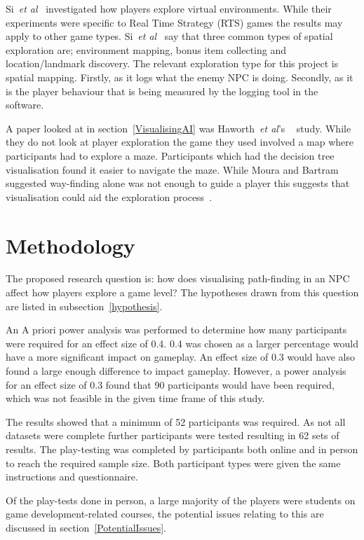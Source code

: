 \documentclass[journal]{IEEEtran}
\begin{document}
	Si~\textit{et al}~\cite{si2017} investigated how players explore virtual environments. While their experiments were specific to Real Time Strategy (RTS) games the results may apply to other game types. Si~\textit{et al}~\cite{si2017} say that three common types of spatial exploration are; environment mapping, bonus item collecting and location/landmark discovery. The relevant exploration type for this project is spatial mapping. Firstly, as it logs what the enemy NPC is doing.  Secondly, as it is the player behaviour that is being measured by the logging tool in the software.
	
	A paper looked at in section~\ref{VisualisingAI} was Haworth~\textit{et al}'s ~\cite{Haworth2010} study. While they do not look at player exploration the game they used involved a map where participants had to explore a maze. Participants which had the decision tree visualisation found it easier to navigate the maze. While Moura and Bartram~\cite{moura2014} suggested way-finding alone was not enough to guide a player this suggests that visualisation could aid the exploration process~\cite{Haworth2010}.
	
	\section{Methodology} \label{methodology}
	The proposed research question is: how does visualising path-finding in an NPC affect how players explore a game level? The hypotheses drawn from this question are listed in subsection~\ref{hypothesis}.  
	
	An A priori power analysis was performed to determine how many participants were required for an effect size of 0.4. 0.4 was chosen as a larger percentage would have a more significant impact on gameplay.  An effect size of 0.3 would have also found a large enough difference to impact gameplay. However, a power analysis for an effect size of 0.3 found that 90 participants would have been required, which was not feasible in the given time frame of this study.
	
	The results showed that a minimum of 52 participants was required. As not all datasets were complete further participants were tested resulting in 62 sets of results. The play-testing was completed by participants both online and in person to reach the required sample size. Both participant types were given the same instructions and questionnaire. 
	
	Of the play-tests done in person, a large majority of the players were students on game development-related courses, the potential issues relating to this are discussed in section~\ref{PotentialIssues}. 
	
\end{document}
